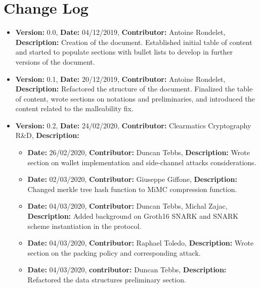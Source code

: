 
\chapter*{Change Log}\label{chap:change-log}
\begin{itemize}
    \item \textbf{Version:} 0.0, \textbf{Date:} 04/12/2019, \textbf{Contributor:} Antoine Rondelet, \textbf{Description:} Creation of the document. Established initial table of content and started to populate sections with bullet lists to develop in further versions of the document.
    \item \textbf{Version:} 0.1, \textbf{Date:} 20/12/2019, \textbf{Contributor:} Antoine Rondelet, \textbf{Description:} Refactored the structure of the document. Finalized the table of content, wrote sections on notations and preliminaries, and introduced the content related to the malleability fix.
    \item \textbf{Version:} 0.2, \textbf{Date:} 24/02/2020, \textbf{Contributor:} Clearmatics Cryptography R\&D, \textbf{Description:}
        \begin{itemize}
            \item \textbf{Date:} 26/02/2020, \textbf{Contributor:} Duncan Tebbs, \textbf{Description:} Wrote section on wallet implementation and side-channel attacks considerations.
            \item \textbf{Date:} 02/03/2020, \textbf{Contributor:} Giuseppe Giffone, \textbf{Description:} Changed merkle tree hash function to MiMC compression function.
            \item \textbf{Date:} 04/03/2020, \textbf{Contributor:} Duncan Tebbs, Michal Zajac, \textbf{Description:} Added background on Groth16 SNARK and SNARK scheme instantiation in the protocol.
            \item \textbf{Date:} 04/03/2020, \textbf{Contributor:} Raphael Toledo, \textbf{Description:} Wrote section on the packing policy and corresponding attack.
            \item \textbf{Date:} 04/03/2020, \textbf{contributor:} Duncan Tebbs, \textbf{Description:} Refactored the data structures preliminary section.

\end{itemize}
\end{itemize}
